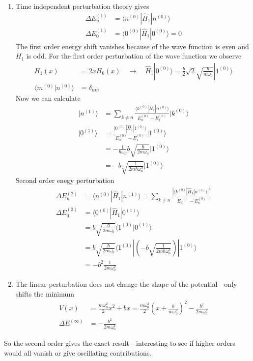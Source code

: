 \documentclass[10pt,a4paper]{article}
\theoremstyle{definition}
\begin{document}
\begin{enumerate}
\item Time independent perturbation theory gives
\begin{align}
\Delta E_n^{(1)}&=\langle n^{(0)}|\hat{H}_1|n^{(0)}\rangle\\
\Delta E_0^{(1)}&=\langle 0^{(0)}|\hat{H}_1|0^{(0)}\rangle =0
\end{align}
The first order energy shift vanishes because of the wave function is even and $H_1$ is odd.
For the first order perturbation of the wave function we observe
\begin{align}
H_1(x)&=2xH_0(x)\quad\rightarrow\quad\hat{H}_1|0^{(0)}\rangle=\frac{b}{2}\sqrt{2}\sqrt{\frac{\hbar}{m\omega_0}}|1^{(0)}\rangle\\
\langle m^{(0)}|n^{(0)}\rangle&=\delta_{nm}
\end{align}
Now we can calculate  
\begin{align}
|n^{(1)}\rangle&=\sum_{k\neq n}\frac{\langle k^{(0)}|\hat{H}_1|n^{(0)}\rangle}{E_n^{(0)}-E_k^{(0)}}|k^{(0)}\rangle\\
|0^{(1)}\rangle&=\frac{\langle 0^{(0)}|\hat{H}_1|1^{(0)}\rangle}{E_0^{(0)}-E_1^{(0)}}|1^{(0)}\rangle\\
&=-\frac{1}{\hbar\omega_0}b\sqrt{\frac{\hbar}{2m\omega_0}}|1^{(0)}\rangle\\
&=-b\sqrt{\frac{1}{2m\hbar\omega_0^3}}|1^{(0)}\rangle
\end{align}
Second order enegy perturbation
\begin{align}
\Delta E_n^{(2)}&=\langle n^{(0)}|\hat{H}_1|n^{(1)}\rangle=\sum_{k\neq n}\frac{|\langle k^{(0)}|\hat{H}_1|n^{(0)}\rangle|^2}{E_n^{(0)}-E_k^{(0)}}\\
\Delta E_0^{(2)}&=\langle 0^{(0)}|\hat{H}_1|0^{(1)}\rangle\\
&=b\sqrt{\frac{\hbar}{2m\omega_0}}\langle 1^{(0)}|0^{(1)}\rangle\\
&=b\sqrt{\frac{\hbar}{2m\omega_0}}\langle 1^{(0)}|\left(-b\sqrt{\frac{1}{2m\hbar\omega_0^3}}\right)|1^{(0)}\rangle\\
&=-b^2\frac{1}{2m\omega_0^2}
\end{align}
\item The linear perturbation does not change the shape of the potential - only shifts the minimum 
\begin{align}
 V(x)&=\frac{m\omega_0^2}{2}x^2+bx=\frac{m\omega_0^2}{2}\left(x+\frac{b}{m\omega_0^2}\right)^2-\frac{b^2}{2m\omega_0^2}\\
\Delta E^{(\infty)}&=-\frac{b^2}{2m\omega_0^2} 
\end{align}
\end{enumerate}
So the second order gives the exact result - interesting to see if higher orders would all  vanish or give oscillating contributions.  
\end{document}
